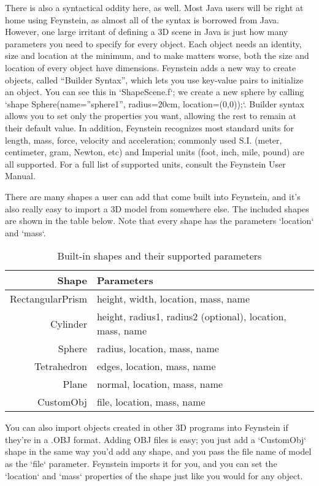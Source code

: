 \documentclass[letterpaper]{article}
\begin{document}
There is also a syntactical oddity here, as well. Most Java users will
be right at home using Feynstein, as almost all of the syntax is
borrowed from Java. However, one large irritant of defining a 3D scene
in Java is just how many parameters you need to specify for every
object. Each object needs an identity, size and location at the
minimum, and to make matters worse, both the size and location of
every object have dimensions. Feynstein adds a new way to create
objects, called “Builder Syntax”, which lets you use key-value pairs
to initialize an object. You can see this in `ShapeScene.f`; we create
a new sphere by calling `shape Sphere(name=”sphere1”, radius=20cm,
location=(0,0));`. Builder syntax allows you to set only the
properties you want, allowing the rest to remain at their default
value. In addition, Feynstein recognizes most standard units for
length, mass, force, velocity and acceleration; commonly used
S.I. (meter, centimeter, gram, Newton, etc) and Imperial units (foot,
inch, mile, pound) are all supported. For a full list of supported
units, consult the Feynstein User Manual.

There are many shapes a user can add that come built into Feynstein,
and it's also really easy to import a 3D model from somewhere
else. The included shapes are shown in the table below. Note that
every shape has the parameters `location` and `mass`.

\begin{table}\centering
  \begin{tabular}{r|l}
    \textbf{Shape} & \textbf{Parameters} \\ \hline
    RectangularPrism & height, width, location, mass, name \\
    Cylinder & height, radius1, radius2 (optional), location, mass, name \\
    Sphere & radius, location, mass, name \\
    Tetrahedron & edges, location, mass, name \\
    Plane & normal, location, mass, name \\
    CustomObj & file, location, mass, name \\
  \end{tabular} 
\caption{Built-in shapes and their supported parameters}
\label{tab:shapes}
\end{table}

You can also import objects created in other 3D programs into
Feynstein if they're in a .OBJ format. Adding OBJ files is easy; you
just add a `CustomObj` shape in the same way you'd add any shape, and
you pass the file name of model as the `file` parameter. Feynstein
imports it for you, and you can set the `location` and `mass`
properties of the shape just like you would for any object.
\end{document}
